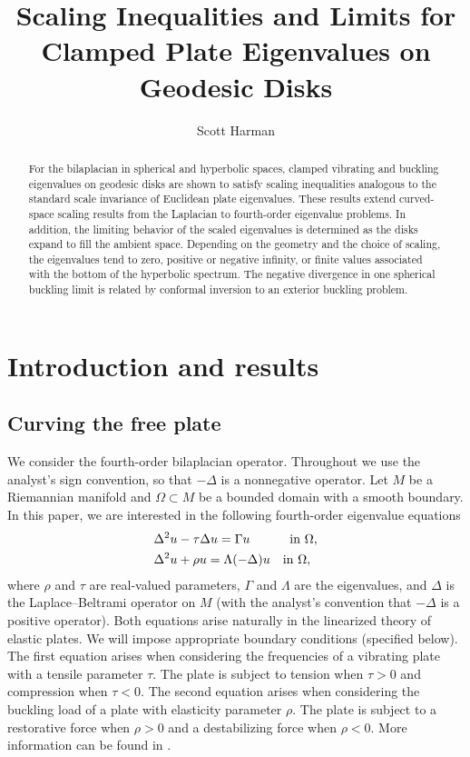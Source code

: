 \documentclass[11pt]{amsart}
\title{Scaling Inequalities and Limits for Clamped Plate Eigenvalues on Geodesic Disks}
\author{Scott Harman}
\date{}
\theoremstyle{definition}
\numberwithin{equation}{section}
\newcommand{\lapl}{\Delta}
\begin{document}
\begin{abstract}
For the bilaplacian in spherical and hyperbolic spaces, clamped vibrating and buckling eigenvalues on geodesic disks are shown to satisfy scaling inequalities analogous to the standard scale invariance of Euclidean plate eigenvalues. These results extend curved-space scaling results from the Laplacian to fourth-order eigenvalue problems. In addition, the limiting behavior of the scaled eigenvalues is determined as the disks expand to fill the ambient space. Depending on the geometry and the choice of scaling, the eigenvalues tend to zero, positive or negative infinity, or finite values associated with the bottom of the hyperbolic spectrum. The negative divergence in one spherical buckling limit is related by conformal inversion to an exterior buckling problem.
\end{abstract}

\maketitle

\section{Introduction and results}
\subsection*{Curving the free plate}
We consider the fourth-order bilaplacian operator. Throughout we use the analyst's sign convention, so that $-\lapl$ is a nonnegative operator. Let $M$ be a Riemannian manifold and $\Omega \subset M$ be a bounded domain with a smooth boundary. In this paper, we are interested in the following fourth-order eigenvalue equations
\begin{align}
&\lapl^2 u - \tau \lapl u = \Gamma u \hspace{1.1cm} \text{in } \Omega,\label{eq:vibreigenprob} \\
&\lapl^2 u + \rho u = \Lambda (-\lapl) u \quad\text{in } \Omega,\label{eq:buckeigenprob}
\end{align}
where $\rho$ and $\tau$ are real-valued parameters, $\Gamma$ and $\Lambda$ are the eigenvalues, and $\lapl$ is the Laplace--Beltrami operator on $M$ (with the analyst's convention that $-\lapl$ is a positive operator). Both equations arise naturally in the linearized theory of elastic plates. We will impose appropriate boundary conditions (specified below). The first equation arises when considering the frequencies of a vibrating plate with a tensile parameter $\tau$. The plate is subject to tension when $\tau > 0$ and compression when $\tau < 0$. The second equation arises when considering the buckling load of a plate with elasticity parameter $\rho$. The plate is subject to a restorative force when $\rho > 0$ and a destabilizing force when $\rho < 0$. More information can be found in \cite{K93}.
\end{document}
